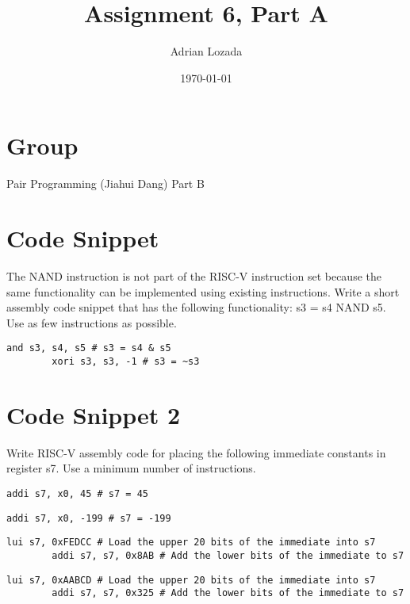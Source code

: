 \documentclass[12pt]{article}
\title{Assignment 6, Part A}
\author{Adrian Lozada}
\date{\today}
\begin{document}
\maketitle
\newpage

    \section{Group}
    Pair Programming (Jiahui Dang) Part B

\section{Code Snippet}
    \begin{flushleft}
        The NAND instruction is not part of the RISC-V instruction set because the same
        functionality can be implemented using existing instructions. Write a short assembly code
        snippet that has the following functionality: s3 = s4 NAND s5. Use as few instructions as
        possible.
    \end{flushleft}
    \begin{lstlisting}[language=RISCV]
        and s3, s4, s5 # s3 = s4 & s5
        xori s3, s3, -1 # s3 = ~s3
    \end{lstlisting}
    
    \section{Code Snippet 2}
    \begin{flushleft}
        Write RISC-V assembly code for placing the following immediate constants in
        register s7. Use a minimum number of instructions.
    \end{flushleft}
    \begin{lstlisting}[language=RISCV]
        addi s7, x0, 45 # s7 = 45
    \end{lstlisting}
    \begin{lstlisting}[language=RISCV]
        addi s7, x0, -199 # s7 = -199
    \end{lstlisting}
    \begin{lstlisting}[language=RISCV]
        lui s7, 0xFEDCC # Load the upper 20 bits of the immediate into s7
        addi s7, s7, 0x8AB # Add the lower bits of the immediate to s7
    \end{lstlisting}
    \begin{lstlisting}[language=RISCV]
        lui s7, 0xAABCD # Load the upper 20 bits of the immediate into s7
        addi s7, s7, 0x325 # Add the lower bits of the immediate to s7
    \end{lstlisting}
\end{document}
